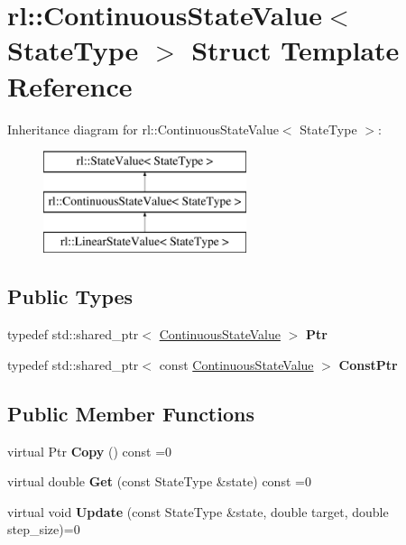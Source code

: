 \hypertarget{structrl_1_1_continuous_state_value}{}\section{rl\+:\+:Continuous\+State\+Value$<$ State\+Type $>$ Struct Template Reference}
\label{structrl_1_1_continuous_state_value}
Inheritance diagram for rl\+:\+:Continuous\+State\+Value$<$ State\+Type $>$\+:\begin{figure}[H]
\begin{center}
\leavevmode
\includegraphics[height=3.000000cm]{structrl_1_1_continuous_state_value}
\end{center}
\end{figure}
\subsection*{Public Types}
\begin{DoxyCompactItemize}
\item 
\hypertarget{structrl_1_1_continuous_state_value_aa6cb9089c50be0af21b209409ad38f63}{}\label{structrl_1_1_continuous_state_value_aa6cb9089c50be0af21b209409ad38f63} 
typedef std\+::shared\+\_\+ptr$<$ \hyperlink{structrl_1_1_continuous_state_value}{Continuous\+State\+Value} $>$ {\bfseries Ptr}
\item 
\hypertarget{structrl_1_1_continuous_state_value_a78afcf460ca5750b44348f337c885fa4}{}\label{structrl_1_1_continuous_state_value_a78afcf460ca5750b44348f337c885fa4} 
typedef std\+::shared\+\_\+ptr$<$ const \hyperlink{structrl_1_1_continuous_state_value}{Continuous\+State\+Value} $>$ {\bfseries Const\+Ptr}
\end{DoxyCompactItemize}
\subsection*{Public Member Functions}
\begin{DoxyCompactItemize}
\item 
\hypertarget{structrl_1_1_continuous_state_value_a0a61b0337779073f7b9ebce1358c1008}{}\label{structrl_1_1_continuous_state_value_a0a61b0337779073f7b9ebce1358c1008} 
virtual Ptr {\bfseries Copy} () const =0
\item 
\hypertarget{structrl_1_1_continuous_state_value_a8e2ff7798ede73a0fe14f473b544664d}{}\label{structrl_1_1_continuous_state_value_a8e2ff7798ede73a0fe14f473b544664d} 
virtual double {\bfseries Get} (const State\+Type \&state) const =0
\item 
\hypertarget{structrl_1_1_continuous_state_value_a5fd70ca28e278eddcb1fd49788ac6a42}{}\label{structrl_1_1_continuous_state_value_a5fd70ca28e278eddcb1fd49788ac6a42} 
virtual void {\bfseries Update} (const State\+Type \&state, double target, double step\+\_\+size)=0
\end{DoxyCompactItemize}


